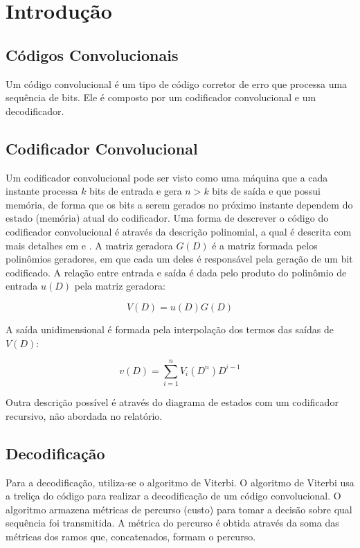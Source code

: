 \section{Introdução}

\subsection{Códigos Convolucionais}

Um código convolucional é um tipo de código corretor de erro que processa uma sequência de bits. Ele é composto por um codificador convolucional e um decodificador.


\subsection{Codificador Convolucional}

Um codificador convolucional pode ser visto como uma máquina que a cada instante processa $k$ bits de entrada e gera $n > k$ bits de saída e que possui memória, de forma que os bits a serem gerados no próximo instante dependem do estado (memória) atual do codificador.
Uma forma de descrever o código do codificador convolucional é através da descrição polinomial, a qual é descrita com mais detalhes em \cite{ref:roteiro2} e \cite{ref:roteiro3}. A matriz geradora $G(D)$ é a matriz formada pelos polinômios geradores, em que cada um deles é responsável pela geração de um bit codificado. A relação entre entrada e saída é dada pelo produto do polinômio de entrada $u(D)$ pela matriz geradora:

\begin{equation}
V(D)=u(D)G(D)
\end{equation}

A saída unidimensional é formada pela interpolação dos termos das saídas de $V(D)$:

\begin{equation}
v(D)= \sum_{i=1}^{n} V_{i}(D^{n})D^{i-1}
\end{equation}

Outra descrição possível é através do diagrama de estados com um codificador recursivo, não abordada no relatório. 

\subsection{Decodificação \label{secao:decodificacao}}
Para a decodificação, utiliza-se o algoritmo de Viterbi. O algoritmo de Viterbi usa a treliça do código para realizar a decodificação de um código convolucional. O algoritmo armazena métricas de percurso (custo) para tomar a decisão sobre qual sequência foi transmitida. A métrica do percurso é obtida através da soma das métricas dos ramos que, concatenados, formam o percurso.

